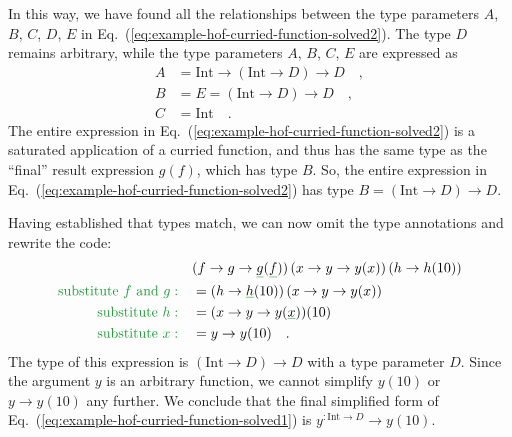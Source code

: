 In this way, we have found all the relationships between the type
parameters $A$, $B$, $C$, $D$, $E$ in Eq.~(\ref{eq:example-hof-curried-function-solved2}).
The type $D$ remains arbitrary, while the type parameters $A$, $B$,
$C$, $E$ are expressed as
\begin{align}
A & =\text{Int}\rightarrow\left(\text{Int}\rightarrow D\right)\rightarrow D\quad,\label{eq:example-hof-curried-solved3}\\
B & =E=\left(\text{Int}\rightarrow D\right)\rightarrow D\quad,\label{eq:example-hof-curried-solved4}\\
C & =\text{Int}\quad.\nonumber 
\end{align}
The entire expression in Eq.~(\ref{eq:example-hof-curried-function-solved2})
is a saturated application of a curried function, and thus has the
same type as the ``final'' result expression $g(f)$, which has
type $B$. So, the entire expression in Eq.~(\ref{eq:example-hof-curried-function-solved2})
has type $B=\left(\text{Int}\rightarrow D\right)\rightarrow D$.

Having established that types match, we can now omit the type annotations
and rewrite the code:
\begin{align*}
 & (f\rightarrow g\rightarrow\gunderline g(\gunderline f))\left(x\rightarrow y\rightarrow y(x)\right)\left(h\rightarrow h(10)\right)\\
{\color{greenunder}\text{substitute }f\text{ and }g:}\quad & =(h\rightarrow\gunderline h(10))\left(x\rightarrow y\rightarrow y(x)\right)\\
{\color{greenunder}\text{substitute }h:}\quad & =(x\rightarrow y\rightarrow y(\gunderline x))(10)\\
{\color{greenunder}\text{substitute }x:}\quad & =y\rightarrow y(10)\quad.
\end{align*}
The type of this expression is $\left(\text{Int}\rightarrow D\right)\rightarrow D$
with a type parameter $D$. Since the argument $y$ is an arbitrary
function, we cannot simplify $y(10)$ or $y\rightarrow y(10)$ any
further. We conclude that the final simplified form of Eq.~(\ref{eq:example-hof-curried-function-solved1})
is $y^{:\text{Int}\rightarrow D}\rightarrow y(10)$.

